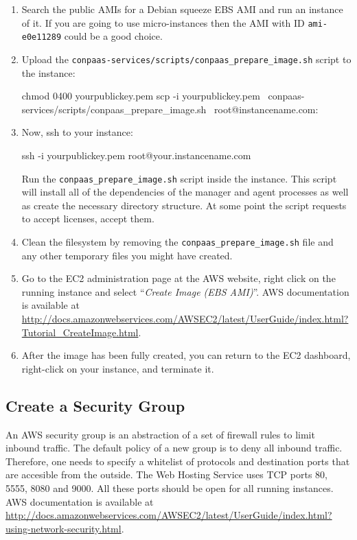 \documentclass[10pt]{article}
\begin{document}
\begin{enumerate}
\item Search the public AMIs for a Debian squeeze EBS AMI and run an
  instance of it. If you are going to use micro-instances then the AMI
  with ID \verb+ami-e0e11289+ could be a good choice.

\item Upload the \verb+conpaas-services/scripts/conpaas_prepare_image.sh+ script to the instance:
  \begin{code}
    chmod 0400 yourpublickey.pem
    scp -i yourpublickey.pem \
      conpaas-services/scripts/conpaas_prepare_image.sh \
      root@instancename.com:
  \end{code}

\item Now, ssh to your instance:
  \begin{code}
    ssh -i yourpublickey.pem root@your.instancename.com
  \end{code}
  Run the \verb+conpaas_prepare_image.sh+ script inside the instance. This
  script will install all of the dependencies of the manager and agent
  processes as well as create the necessary directory structure. At
  some point the script requests to accept licenses, accept them.

\item Clean the filesystem by removing the
  \verb+conpaas_prepare_image.sh+ file and any other temporary files you might
  have created.

\item Go to the EC2 administration page at the AWS website, right
  click on the running instance and select ``\emph{Create Image (EBS
    AMI)}''.  AWS
  documentation is available at
  \url{http://docs.amazonwebservices.com/AWSEC2/latest/UserGuide/index.html?Tutorial_CreateImage.html}.

\item After the image has been fully created, you can return to the
  EC2 dashboard, right-click on your instance, and terminate it.
\end{enumerate}

\subsection{Create a Security Group}

An AWS security group is an abstraction of a set of firewall rules to
limit inbound traffic. The default policy of a new group is to deny
all inbound traffic. Therefore, one needs to specify a whitelist of
protocols and destination ports that are accesible from the outside.
The Web Hosting Service uses TCP ports 80, 5555, 8080 and 9000. All
these ports should be open for all running instances.  AWS
documentation is available at
\url{http://docs.amazonwebservices.com/AWSEC2/latest/UserGuide/index.html?using-network-security.html}.
\end{document}
